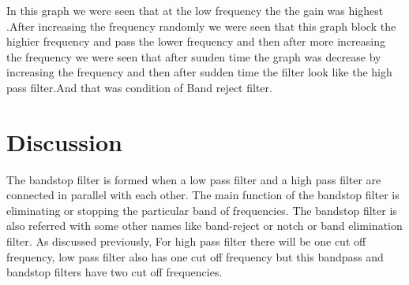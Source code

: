 \documentclass[12pt]{article}
\begin{document}
In this graph we were seen that at the low frequency the the gain was highest .After increasing the frequency randomly we were seen that this graph block the highier frequency and pass the lower frequency and then after more increasing the frequency we were seen that after suuden time the graph was decrease by increasing the frequency and then after sudden time the filter look like the high pass filter.And that was condition of Band reject filter.

\section{Discussion}
The bandstop filter is formed when a low pass filter and a high pass filter are connected in parallel with each other. The main function of the bandstop filter is eliminating or stopping the particular band of frequencies. The bandstop filter is also referred with some other names like band-reject or notch or band elimination filter. As discussed previously, For high pass filter there will be one cut off frequency, low pass filter also has one cut off frequency but this bandpass and bandstop filters have two cut off frequencies. \\~\\
\end{document}
